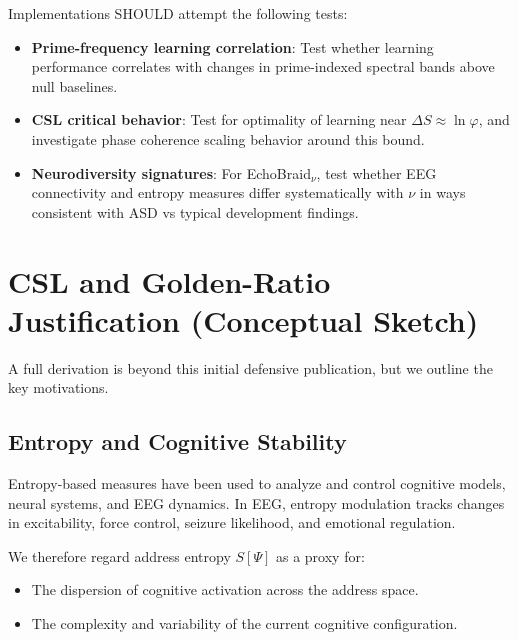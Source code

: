 \documentclass[11pt]{article}
\begin{document}
Implementations SHOULD attempt the following tests:

\begin{itemize}[noitemsep]
  \item \textbf{Prime-frequency learning correlation}: Test whether learning performance correlates with changes in prime-indexed spectral bands above null baselines. \cite{EEGEntropyForce}
  \item \textbf{CSL critical behavior}: Test for optimality of learning near $\Delta S \approx \ln \varphi$, and investigate phase coherence scaling behavior around this bound. \cite{GoldenEEG,GoldenRatioInfo}
  \item \textbf{Neurodiversity signatures}: For EchoBraid$_\nu$, test whether EEG connectivity and entropy measures differ systematically with $\nu$ in ways consistent with ASD vs typical development findings. \cite{EEGEntropyASD,EEGEntropyASD2,EEGEntropyASD3}
\end{itemize}

\section{CSL and Golden-Ratio Justification (Conceptual Sketch)}

A full derivation is beyond this initial defensive publication, but we outline the key motivations.

\subsection{Entropy and Cognitive Stability}

Entropy-based measures have been used to analyze and control cognitive models, neural systems, and EEG dynamics. \cite{EntropyCognitiveModels,EntropyNeuralControl,EEGEntropyForce,EEGEntropyEmotion} In EEG, entropy modulation tracks changes in excitability, force control, seizure likelihood, and emotional regulation. \cite{EEGEntropyForce,EEGEntropySeizure,EEGEntropyBiomarker,EEGEntropyEmotion}

We therefore regard address entropy $S[\Psi]$ as a proxy for:

\begin{itemize}[noitemsep]
  \item The dispersion of cognitive activation across the address space.
  \item The complexity and variability of the current cognitive configuration.
\end{itemize}
\end{document}
